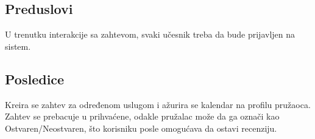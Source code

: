 \documentclass[a4paper,12pt]{report}
\begin{document}
		\subsection{Preduslovi}
			U trenutku interakcije sa zahtevom, svaki učesnik treba da bude prijavljen na sistem.
		\subsection{Posledice}
			Kreira se zahtev za određenom uslugom i ažurira se kalendar na profilu pružaoca.
			Zahtev se prebacuje u prihvaćene, odakle pružalac može da ga označi kao Ostvaren/Neostvaren, što korisniku posle omogućava da ostavi recenziju.
\end{document}
